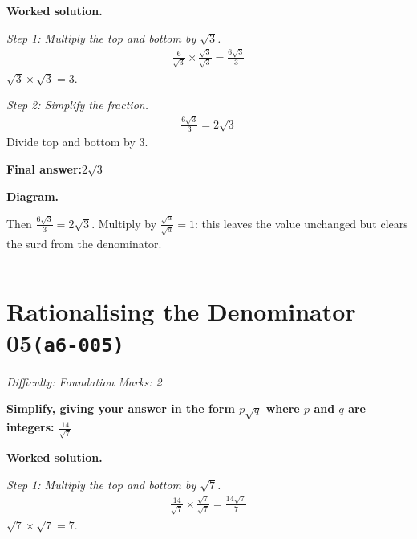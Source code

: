 \documentclass[11pt]{article}
\newcommand{\question}[1]{\par\medskip\noindent\textbf{#1}\par}
\begin{document}
\textbf{Worked solution.}

\textit{Step 1: Multiply the top and bottom by \( \sqrt{3} \).}
\[\begin{gathered}
\frac{6}{\sqrt{3}} \times \frac{\sqrt{3}}{\sqrt{3}} = \frac{6\sqrt{3}}{3}
\end{gathered}\]
\( \sqrt{3} \times \sqrt{3} = 3 \).

\textit{Step 2: Simplify the fraction.}
\[\begin{gathered}
\frac{6\sqrt{3}}{3} = 2\sqrt{3}
\end{gathered}\]
Divide top and bottom by 3.

\begin{answerbox}
\textbf{Final answer:}\quad \(\displaystyle 2\sqrt{3}\)
\end{answerbox}
\textbf{Diagram.}

\begin{center}
\end{center}
\small Then $\frac{6\sqrt3}{3}=2\sqrt3$. Multiply by $\frac{\sqrt{a}}{\sqrt{a}}=1$: this leaves the value unchanged but clears the surd from the denominator.\normalsize

\medskip\hrule

\section*{Rationalising the Denominator 05\quad\small\texttt{(a6-005)}}
\textit{Difficulty: Foundation \quad\textbar\quad Marks: 2}

\question{Simplify, giving your answer in the form \( p\sqrt{q} \) where \( p \) and \( q \) are integers: \( \frac{14}{\sqrt{7}} \)}

\textbf{Worked solution.}

\textit{Step 1: Multiply the top and bottom by \( \sqrt{7} \).}
\[\begin{gathered}
\frac{14}{\sqrt{7}} \times \frac{\sqrt{7}}{\sqrt{7}} = \frac{14\sqrt{7}}{7}
\end{gathered}\]
\( \sqrt{7} \times \sqrt{7} = 7 \).
\end{document}
